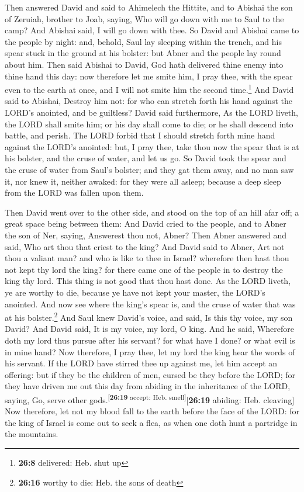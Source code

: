  Then answered David and said to Ahimelech the Hittite,
and to Abishai the son of Zeruiah, brother to Joab, saying, Who will go
down with me to Saul to the camp? And Abishai said, I will go down with
thee.  So David and Abishai came to the people by night:
and, behold, Saul lay sleeping within the trench, and his spear stuck in
the ground at his bolster: but Abner and the people lay round about him.
 Then said Abishai to David, God hath delivered thine
enemy into thine hand this day: now therefore let me smite him, I pray
thee, with the spear even to the earth at once, and I will not smite him
the second time.\footnote{\textbf{26:8} delivered: Heb. shut up}
 And David said to Abishai, Destroy him not: for who can
stretch forth his hand against the LORD's anointed, and be guiltless?
 David said furthermore, As the LORD liveth, the LORD
shall smite him; or his day shall come to die; or he shall descend into
battle, and perish.  The LORD forbid that I should
stretch forth mine hand against the LORD's anointed: but, I pray thee,
take thou now the spear that is at his bolster, and the cruse of water,
and let us go.  So David took the spear and the cruse of
water from Saul's bolster; and they gat them away, and no man saw it,
nor knew it, neither awaked: for they were all asleep; because a deep
sleep from the LORD was fallen upon them.

 Then David went over to the other side, and stood on the
top of an hill afar off; a great space being between them:
 And David cried to the people, and to Abner the son of
Ner, saying, Answerest thou not, Abner? Then Abner answered and said,
Who art thou that criest to the king?  And David said to
Abner, Art not thou a valiant man? and who is like to thee in Israel?
wherefore then hast thou not kept thy lord the king? for there came one
of the people in to destroy the king thy lord.  This
thing is not good that thou hast done. As the LORD liveth, ye are worthy
to die, because ye have not kept your master, the LORD's anointed. And
now see where the king's spear is, and the cruse of water that was at
his bolster.\footnote{\textbf{26:16} worthy to die: Heb. the sons of
  death}  And Saul knew David's voice, and said, Is this
thy voice, my son David? And David said, It is my voice, my lord, O
king.  And he said, Wherefore doth my lord thus pursue
after his servant? for what have I done? or what evil is in mine hand?
 Now therefore, I pray thee, let my lord the king hear
the words of his servant. If the LORD have stirred thee up against me,
let him accept an offering: but if they be the children of men, cursed
be they before the LORD; for they have driven me out this day from
abiding in the inheritance of the LORD, saying, Go, serve other
gods.\textsuperscript{{[}\textbf{26:19} accept: Heb.
smell{]}}{[}\textbf{26:19} abiding: Heb. cleaving{]}  Now
therefore, let not my blood fall to the earth before the face of the
LORD: for the king of Israel is come out to seek a flea, as when one
doth hunt a partridge in the mountains.

